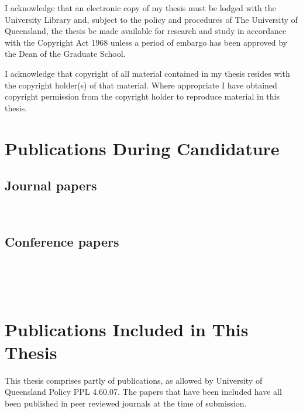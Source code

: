   I acknowledge that an electronic copy of my thesis must be lodged with the University Library and, subject to the policy and procedures of The University of Queensland, the thesis be made available for research and study in accordance with the Copyright Act 1968 unless a period of embargo has been approved by the Dean of the Graduate School.

  I acknowledge that copyright of all material contained in my thesis resides with the copyright holder(s) of that material. Where appropriate I have obtained copyright permission from the copyright holder to reproduce material in this thesis.

\clearpage
\section*{Publications During Candidature}

\subsection*{Journal papers}

\noindent{}\\


\subsection*{Conference papers}

\noindent{}\\

\noindent{}\\

\noindent{}\\

\section*{Publications Included in This Thesis}

This thesis comprises partly of publications, as allowed by University of Queensland Policy PPL 4.60.07. The papers that have been included have all been published in peer reviewed journals at the time of submission. 

\vspace{\baselineskip}

